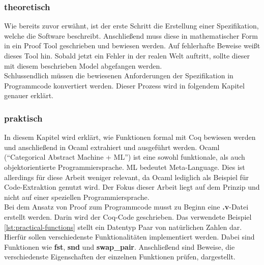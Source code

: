 \subsubsection{theoretisch}
{Wie bereits zuvor erwähnt, ist der erste Schritt die Erstellung einer Spezifikation, welche die Software beschreibt. Anschließend muss diese in mathematischer Form in ein Proof Tool geschrieben und bewiesen werden. Auf fehlerhafte Beweise weißt dieses Tool hin.
Sobald jetzt ein Fehler in der realen Welt auftritt, sollte dieser mit diesem beschrieben Model abgefangen werden. \\
Schlussendlich müssen die bewiesenen Anforderungen der Spezifikation in Programmcode konvertiert werden. Dieser Prozess wird in folgendem Kapitel genauer erklärt.}\cite{HELWER01:FV}

\subsubsection{praktisch}
In diesem Kapitel wird erklärt, wie Funktionen formal mit Coq bewiesen werden und anschließend in Ocaml extrahiert und ausgeführt werden. Ocaml ("`Categorical Abstract Machine + ML"') ist eine sowohl funktionale, als auch objektorientierte Programmiersprache. ML bedeutet Meta-Language. Dies ist allerdings für diese Arbeit weniger relevant, da Ocaml lediglich als Beispiel für Code-Extraktion genutzt wird. Der Fokus dieser Arbeit liegt auf dem Prinzip und nicht auf einer speziellen Programmiersprache.\\
Bei dem Ansatz von Proof zum Programmcode musst zu Beginn eine \textbf{.v}-Datei erstellt werden. Darin wird der Coq-Code geschrieben. Das verwendete Beispiel \ref{lst:practical-functions} stellt ein Datentyp Paar von natürlichen Zahlen dar. Hierfür sollen verschiedenste Funktionalitäten implementiert werden. Dabei sind Funktionen wie \textbf{fst}, \textbf{snd} und \textbf{swap\_pair}. Anschließend sind Beweise, die verschiedenste Eigenschaften der einzelnen Funktionen prüfen, dargestellt.

